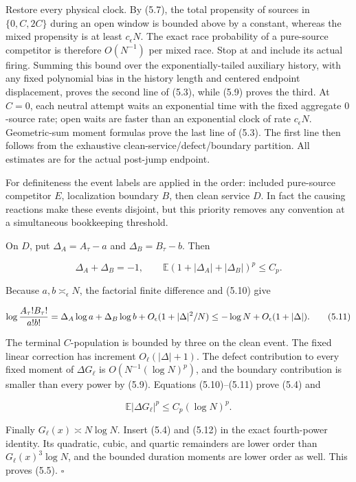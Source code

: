 Restore every physical clock. By (5.7), the total propensity of sources
in \(\{0,C,2C\}\) during an open window is bounded above by a constant,
whereas the mixed propensity is at least \(c_\epsilon N\). The exact
race probability of a pure-source competitor is therefore \(O(N^{-1})\)
per mixed race. Stop at and include its actual firing. Summing this
bound over the exponentially-tailed auxiliary history, with any fixed
polynomial bias in the history length and centered endpoint
displacement, proves the second line of (5.3), while (5.9) proves the
third. At \(C=0\), each neutral attempt waits an exponential time with
the fixed aggregate \(0\)-source rate; open waits are faster than an
exponential clock of rate \(c_\epsilon N\). Geometric-sum moment
formulas prove the last line of (5.3). The first line then follows from
the exhaustive clean-service/defect/boundary partition. All estimates
are for the actual post-jump endpoint.

For definiteness the event labels are applied in the order: included
pure-source competitor \(E\), localization boundary \(B\), then clean
service \(D\). In fact the causing reactions make these events disjoint,
but this priority removes any convention at a simultaneous bookkeeping
threshold.

On \(D\), put \(\Delta_A=A_\tau-a\) and \(\Delta_B=B_\tau-b\). Then

\[
          \Delta_A+\Delta_B=-1,\qquad
          \mathbb E(1+|\Delta_A|+|\Delta_B|)^p\le C_p.          \tag{5.10}
\]

Because \(a,b\asymp_\epsilon N\), the factorial finite difference and
(5.10) give

\[
 \log{A_\tau!B_\tau!\over a!b!}
   =\Delta_A\log a+\Delta_B\log b+O_\epsilon(1+|\Delta|^2/N)
   \le-\log N+O_\epsilon(1+|\Delta|).                           \tag{5.11}
\]

The terminal \(C\)-population is bounded by three on the clean event.
The fixed linear correction has increment \(O_\ell(|\Delta|+1)\). The
defect contribution to every fixed moment of \(\Delta G_\ell\) is
\(O(N^{-1}(\log N)^p)\), and the boundary contribution is smaller than
every power by (5.9). Equations (5.10)--(5.11) prove (5.4) and

\[
                     \mathbb E|\Delta G_\ell|^p
                             \le C_p(\log N)^p.                  \tag{5.12}
\]

Finally \(G_\ell(x)\asymp N\log N\). Insert (5.4) and (5.12) in the
exact fourth-power identity. Its quadratic, cubic, and quartic
remainders are lower order than \(G_\ell(x)^3\log N\), and the bounded
duration moments are lower order as well. This proves (5.5). \(\square\)

